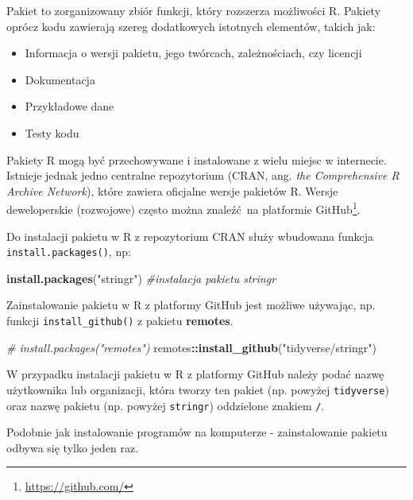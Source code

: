 \documentclass[paper=6in:9in,pagesize=pdftex,headinclude=on,footinclude=on,10pt]{scrbook}
\newenvironment{Shaded}{\begin{snugshade}}{\end{snugshade}}
\newcommand{\CommentTok}[1]{\textcolor[rgb]{0.56,0.35,0.01}{\textit{#1}}}
\newcommand{\KeywordTok}[1]{\textcolor[rgb]{0.13,0.29,0.53}{\textbf{#1}}}
\newcommand{\NormalTok}[1]{#1}
\newcommand{\OperatorTok}[1]{\textcolor[rgb]{0.81,0.36,0.00}{\textbf{#1}}}
\newcommand{\StringTok}[1]{\textcolor[rgb]{0.31,0.60,0.02}{#1}}
\DeclareRobustCommand{\href}[2]{#2\footnote{\url{#1}}}
\providecommand{\tightlist}{%
  \setlength{\itemsep}{0pt}\setlength{\parskip}{0pt}}
\begin{document}
Pakiet to zorganizowany zbiór funkcji, który rozszerza możliwości R.
Pakiety oprócz kodu zawierają szereg dodatkowych istotnych elementów, takich jak:

\begin{itemize}
\tightlist
\item
  Informacja o wersji pakietu, jego twórcach, zależnościach, czy licencji
\item
  Dokumentacja
\item
  Przykładowe dane
\item
  Testy kodu
\end{itemize}

Pakiety R mogą być przechowywane i instalowane z wielu miejsc w internecie.
Istnieje jednak jedno centralne repozytorium (CRAN, ang. \emph{the Comprehensive R Archive Network}), które zawiera oficjalne wersje pakietów R.
Wersje deweloperskie (rozwojowe) często można znaleźć~na platformie \href{https://github.com/}{GitHub}.

Do instalacji pakietu w R z repozytorium CRAN służy wbudowana funkcja \texttt{install.packages()}, np:

\begin{Shaded}
\begin{Highlighting}[]
\KeywordTok{install.packages}\NormalTok{(}\StringTok{"stringr"}\NormalTok{) }\CommentTok{#instalacja pakietu stringr}
\end{Highlighting}
\end{Shaded}

Zainstalowanie pakietu w R z platformy GitHub jest możliwe używając, np. funkcji \texttt{install\_github()} z pakietu \textbf{remotes}.

\begin{Shaded}
\begin{Highlighting}[]
\CommentTok{# install.packages("remotes")}
\NormalTok{remotes}\OperatorTok{::}\KeywordTok{install_github}\NormalTok{(}\StringTok{"tidyverse/stringr"}\NormalTok{)}
\end{Highlighting}
\end{Shaded}

W przypadku instalacji pakietu w R z platformy GitHub należy podać nazwę użytkownika lub organizacji, która tworzy ten pakiet (np. powyżej \texttt{tidyverse}) oraz nazwę pakietu (np. powyżej \texttt{stringr}) oddzielone znakiem \texttt{/}.

Podobnie jak instalowanie programów na komputerze - zainstalowanie pakietu odbywa się tylko jeden raz.
\end{document}
